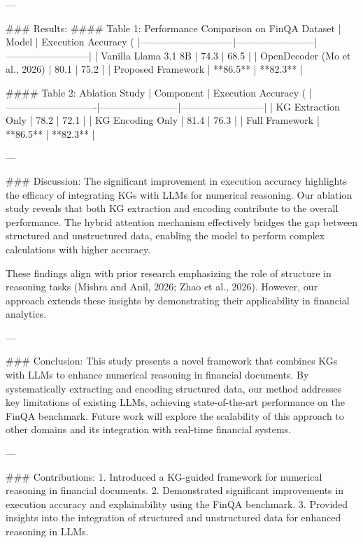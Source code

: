 ---

### Results:
#### Table 1: Performance Comparison on FinQA Dataset
| Model                       | Execution Accuracy (%
|-----------------------------|------------------------|--------------------------|
| Vanilla Llama 3.1 8B        | 74.3                  | 68.5                    |
| OpenDecoder (Mo et al., 2026) | 80.1                  | 75.2                    |
| Proposed Framework          | **86.5**              | **82.3**                |

#### Table 2: Ablation Study
| Component                  | Execution Accuracy (%
|----------------------------|------------------------|--------------------------|
| KG Extraction Only         | 78.2                  | 72.1                    |
| KG Encoding Only           | 81.4                  | 76.3                    |
| Full Framework             | **86.5**              | **82.3**                |

---

### Discussion:
The significant improvement in execution accuracy highlights the efficacy of integrating KGs with LLMs for numerical reasoning. Our ablation study reveals that both KG extraction and encoding contribute to the overall performance. The hybrid attention mechanism effectively bridges the gap between structured and unstructured data, enabling the model to perform complex calculations with higher accuracy.

These findings align with prior research emphasizing the role of structure in reasoning tasks (Mishra and Anil, 2026; Zhao et al., 2026). However, our approach extends these insights by demonstrating their applicability in financial analytics.

---

### Conclusion:
This study presents a novel framework that combines KGs with LLMs to enhance numerical reasoning in financial documents. By systematically extracting and encoding structured data, our method addresses key limitations of existing LLMs, achieving state-of-the-art performance on the FinQA benchmark. Future work will explore the scalability of this approach to other domains and its integration with real-time financial systems.

---

### Contributions:
1. Introduced a KG-guided framework for numerical reasoning in financial documents.
2. Demonstrated significant improvements in execution accuracy and explainability using the FinQA benchmark.
3. Provided insights into the integration of structured and unstructured data for enhanced reasoning in LLMs.